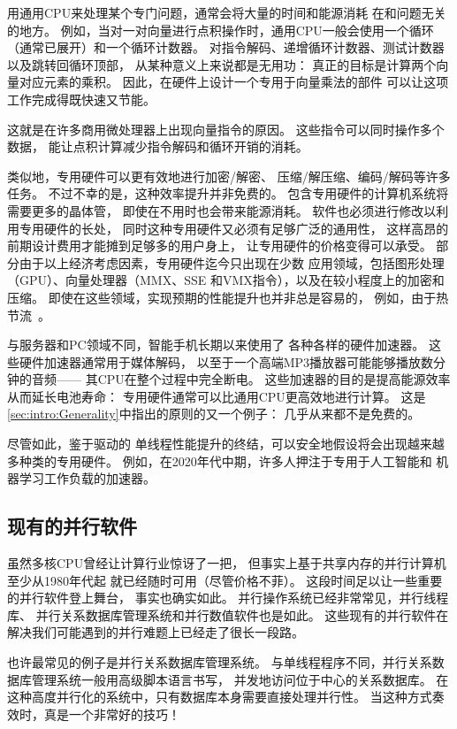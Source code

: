 用通用CPU来处理某个专门问题，通常会将大量的时间和能源消耗
在和问题无关的地方。
例如，当对一对向量进行点积操作时，通用CPU一般会使用一个循环
（通常已展开）和一个循环计数器。
对指令解码、递增循环计数器、测试计数器以及跳转回循环顶部，
从某种意义上来说都是无用功：
真正的目标是计算两个向量对应元素的乘积。
因此，在硬件上设计一个专用于向量乘法的部件
可以让这项工作完成得既快速又节能。

这就是在许多商用微处理器上出现向量指令的原因。
这些指令可以同时操作多个数据，
能让点积计算减少指令解码和循环开销的消耗。

类似地，专用硬件可以更有效地进行加密/解密、
压缩/解压缩、编码/解码等许多任务。
不过不幸的是，这种效率提升并非免费的。
包含专用硬件的计算机系统将需要更多的晶体管，
即使在不用时也会带来能源消耗。
软件也必须进行修改以利用专用硬件的长处，
同时这种专用硬件又必须有足够广泛的通用性，
这样高昂的前期设计费用才能摊到足够多的用户身上，
让专用硬件的价格变得可以承受。
部分由于以上经济考虑因素，专用硬件迄今只出现在少数
应用领域，包括图形处理（GPU）、向量处理器（MMX、SSE
和VMX指令），以及在较小程度上的加密和压缩。
即使在这些领域，实现预期的性能提升也并非总是容易的，
例如，由于热节流~\cite{VladKrasnov2017SIMDfreqscale,DanielLemire2018SIMDfreqscale,TravisDowns2020SIMDfreqscale}。

与服务器和PC领域不同，智能手机长期以来使用了
各种各样的硬件加速器。
这些硬件加速器通常用于媒体解码，
以至于一个高端MP3播放器可能能够播放数分钟的音频——
其CPU在整个过程中完全断电。
这些加速器的目的是提高能源效率从而延长电池寿命：
专用硬件通常可以比通用CPU更高效地进行计算。
这是\cref{sec:intro:Generality}中指出的原则的又一个例子：
几乎从来都不是免费的。

尽管如此，鉴于驱动的
单线程性能提升的终结，可以安全地假设将会出现越来越多种类的专用硬件。
例如，在2020年代中期，许多人押注于专用于人工智能和
机器学习工作负载的加速器。

\subsection{现有的并行软件}
\label{sec:cpu:Existing Parallel Software}

虽然多核CPU曾经让计算行业惊讶了一把，
但事实上基于共享内存的并行计算机至少从1980年代起
就已经随时可用（尽管价格不菲）。
这段时间足以让一些重要的并行软件登上舞台，
事实也确实如此。
并行操作系统已经非常常见，并行线程库、
并行关系数据库管理系统和并行数值软件也是如此。
这些现有的并行软件在解决我们可能遇到的并行难题上已经走了很长一段路。

也许最常见的例子是并行关系数据库管理系统。
与单线程程序不同，并行关系数据库管理系统一般用高级脚本语言书写，
并发地访问位于中心的关系数据库。
在这种高度并行化的系统中，只有数据库本身需要直接处理并行性。
当这种方式奏效时，真是一个非常好的技巧！
